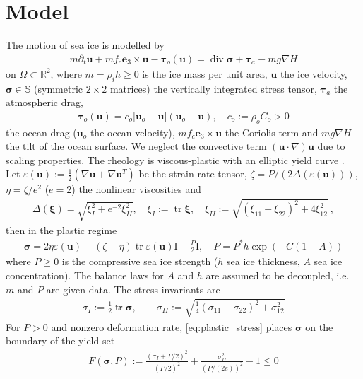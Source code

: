 \documentclass{article}
\theoremstyle{definition}
\newcommand{\bfu}{\boldsymbol{u}}
\newcommand{\bfsigma}{\boldsymbol{\sigma}}
\newcommand{\bftau}{\boldsymbol{\tau}}
\newcommand{\bfxi}{\boldsymbol{\xi}}
\newcommand{\bfe}{\boldsymbol{e}}
\newcommand{\bfI}{\boldsymbol{\mathrm{I}}}
\renewcommand\div{\operatorname{\mathrm{div}}}
\DeclareMathOperator{\tr}{tr}
\begin{document}
\section{Model}
The motion of sea ice is modelled by
\begin{align*}
    m \partial_t \bfu  + m f_c \bfe_3 \times \bfu - \bftau_o(\bfu) = \div \bfsigma + \bftau_a - mg\nabla H
\end{align*}
on $\Omega \subset \mathbb R^{2}$, where $m=\rho_{i}h \geq 0$ is the ice mass per unit area, $\bfu$
the ice velocity, $\bfsigma \in \mathbb S$ (symmetric $2\times 2$ matrices) the vertically integrated stress tensor,
$\bftau_a$ the atmospheric drag,
\begin{align*}
    \bftau_o (\bfu) = c_o |\bfu_o-\bfu|(\bfu_o-\bfu), \quad c_o := \rho_o C_o >0
\end{align*}
the ocean drag ($\bfu_o$ the ocean velocity), $mf_c \bfe_3 \times \bfu$ the Coriolis term and $mg\nabla H$ the tilt of the ocean surface.
We neglect the convective term $(\bfu \cdot \nabla)\bfu$ due to scaling properties.
The rheology is viscous-plastic with an elliptic yield curve \cite{H79}.
Let $\varepsilon(\bfu) := \frac{1}{2} (\nabla\bfu+\nabla\bfu^T)$ be the strain rate tensor, $\zeta = P/(2\Delta(\varepsilon(\bfu)))$, $\eta=\zeta/e^2$ ($e=2$) the nonlinear viscosities and
\begin{align*}
    \Delta (\bfxi) = \sqrt{\xi^2_I+ e^{-2}\xi_{II}^2}, \quad
    \xi_I := \tr \bfxi, \quad \xi_{II} := \sqrt{(\xi_{11}-\xi_{22})^2 +4 \xi_{12}^2} \ ,
\end{align*}
then in the plastic regime
\begin{align}
    \bfsigma = 2\eta \varepsilon(\bfu) + (\zeta-\eta) \tr \varepsilon(\bfu) \bfI - \frac{P}{2}\bfI, \quad
    P= P^*h \exp(-C(1-A)) \label{eq:plastic_stress}
\end{align}
where $P\geq 0$ is the compressive sea ice strength ($h$ sea ice thickness, $A$ sea ice concentration). The balance laws for $A$ and $h$
are assumed to be decoupled, i.e.\ $m$ and $P$ are given data.
The stress invariants are
\begin{align*}
    \sigma_I := \frac{1}{2} \tr \bfsigma , \qquad \sigma_{II} := \sqrt{\frac{1}{4}(\sigma_{11}-\sigma_{22})^2 +\sigma_{12}^2}
\end{align*}
For $P>0$ and nonzero deformation rate, \eqref{eq:plastic_stress}
places $\bfsigma$ on the boundary of the yield set
\begin{align}
    F(\bfsigma, P) := \frac{(\sigma_I + P/2)^2}{(P/2)^2} + \frac{\sigma_{II}^2}{(P/(2e))^2} -1 \leq 0 \label{eq:def_F}
\end{align}
\end{document}

